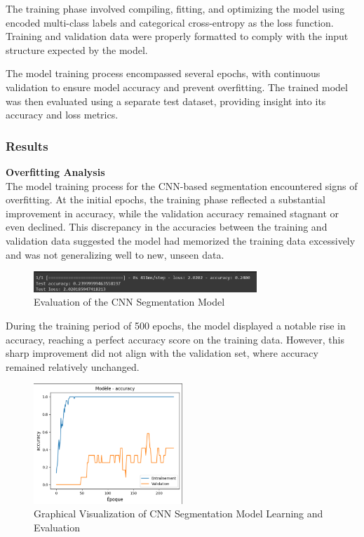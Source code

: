 The training phase involved compiling, fitting, and optimizing the model using encoded multi-class labels and categorical cross-entropy as the loss function. Training and validation data were properly formatted to comply with the input structure expected by the model.

The model training process encompassed several epochs, with continuous validation to ensure model accuracy and prevent overfitting. The trained model was then evaluated using a separate test dataset, providing insight into its accuracy and loss metrics.

\subsubsection{Results}

\noindent \textbf{Overfitting Analysis}\\

\noindent The model training process for the CNN-based segmentation encountered signs of overfitting. At the initial epochs, the training phase reflected a substantial improvement in accuracy, while the validation accuracy remained stagnant or even declined. This discrepancy in the accuracies between the training and validation data suggested the model had memorized the training data excessively and was not generalizing well to new, unseen data.

\begin{figure}[H]
  \centering
  \includegraphics[width=0.75\textwidth]{img/SegCNNEval.png}
  \caption{Evaluation of the CNN Segmentation Model}
  \label{SegCNNEval}
\end{figure}

\noindent During the training period of 500 epochs, the model displayed a notable rise in accuracy, reaching a perfect accuracy score on the training data. However, this sharp improvement did not align with the validation set, where accuracy remained relatively unchanged.

\begin{figure}[H]
  \centering
  \includegraphics[width=0.5\textwidth]{img/SegCNNGraph.png}
  \caption{Graphical Visualization of CNN Segmentation Model Learning and Evaluation}
  \label{SegCNNGraph}
\end{figure}

